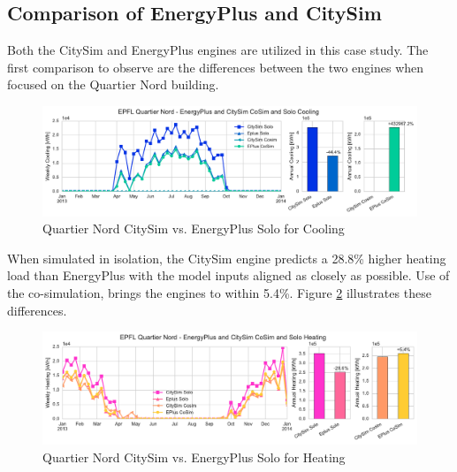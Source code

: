 \documentclass{tBPS2e}
\theoremstyle{plain}
\theoremstyle{definition}
\theoremstyle{remark}
\begin{document}


\subsection{Comparison of EnergyPlus and CitySim}

Both the CitySim and EnergyPlus engines are utilized in this case study. The first comparison to observe are the differences between the two engines when focused on the Quartier Nord building. 

\begin{figure}[H]
\centering
\includegraphics[scale=0.55]{figures/QN_Cooling}
\caption{Quartier Nord CitySim vs. EnergyPlus Solo for Cooling}
\label{fig:qn_eplusvscitysim_cooling}
\end{figure}

When simulated in isolation, the CitySim engine predicts a 28.8\% higher heating load than EnergyPlus with the model inputs aligned as closely as possible. Use of the co-simulation, brings the engines to within 5.4\%. Figure \ref{fig:qn_eplusvscitysim_heating} illustrates these differences.

\begin{figure}[H]
\centering
\includegraphics[scale=0.55]{figures/QN_Heating.pdf}
\caption{Quartier Nord CitySim vs. EnergyPlus Solo for Heating}
\label{fig:qn_eplusvscitysim_heating}
\end{figure}
\end{document}
